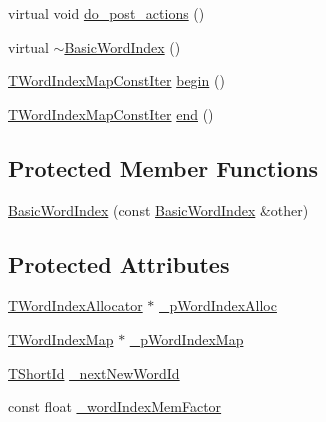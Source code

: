 \begin{DoxyCompactItemize}
virtual void \hyperlink{classuva_1_1smt_1_1tries_1_1dictionary_1_1_basic_word_index_a8f76161797b91979e1c94d3a8be6ae82}{do\+\_\+post\+\_\+actions} ()
\item 
virtual \hyperlink{classuva_1_1smt_1_1tries_1_1dictionary_1_1_basic_word_index_aae2a6fd6f0a6d6d5b76278f628b31ba1}{$\sim$\+Basic\+Word\+Index} ()
\item 
\hyperlink{classuva_1_1smt_1_1tries_1_1dictionary_1_1_basic_word_index_aedf00c11ba1f7ef5565ed7ed523087ec}{T\+Word\+Index\+Map\+Const\+Iter} \hyperlink{classuva_1_1smt_1_1tries_1_1dictionary_1_1_basic_word_index_aa918c020da3d1559f327776a1177404d}{begin} ()
\item 
\hyperlink{classuva_1_1smt_1_1tries_1_1dictionary_1_1_basic_word_index_aedf00c11ba1f7ef5565ed7ed523087ec}{T\+Word\+Index\+Map\+Const\+Iter} \hyperlink{classuva_1_1smt_1_1tries_1_1dictionary_1_1_basic_word_index_aa6fd45516d2be557c6447124880f23c6}{end} ()
\end{DoxyCompactItemize}
\subsection*{Protected Member Functions}
\begin{DoxyCompactItemize}
\item 
\hyperlink{classuva_1_1smt_1_1tries_1_1dictionary_1_1_basic_word_index_a7a4a2a9a405e6073f1c5aec4040327bf}{Basic\+Word\+Index} (const \hyperlink{classuva_1_1smt_1_1tries_1_1dictionary_1_1_basic_word_index}{Basic\+Word\+Index} \&other)
\end{DoxyCompactItemize}
\subsection*{Protected Attributes}
\begin{DoxyCompactItemize}
\item 
\hyperlink{classuva_1_1smt_1_1tries_1_1dictionary_1_1_basic_word_index_a8905f9a7cdaf1c7295043be33de20749}{T\+Word\+Index\+Allocator} $\ast$ \hyperlink{classuva_1_1smt_1_1tries_1_1dictionary_1_1_basic_word_index_a466c8ca9da06fd8c6640f20b77ca5b8a}{\+\_\+p\+Word\+Index\+Alloc}
\item 
\hyperlink{classuva_1_1smt_1_1tries_1_1dictionary_1_1_basic_word_index_ab9afbbd6dda7d8579f804508ac094574}{T\+Word\+Index\+Map} $\ast$ \hyperlink{classuva_1_1smt_1_1tries_1_1dictionary_1_1_basic_word_index_a549d0686e0530922a7261e33a0cdfd20}{\+\_\+p\+Word\+Index\+Map}
\item 
\hyperlink{namespaceuva_1_1smt_1_1hashing_adcf22e1982ad09d3a63494c006267469}{T\+Short\+Id} \hyperlink{classuva_1_1smt_1_1tries_1_1dictionary_1_1_basic_word_index_a416378bae82da48aea2aa2b83f54731b}{\+\_\+next\+New\+Word\+Id}
\item 
const float \hyperlink{classuva_1_1smt_1_1tries_1_1dictionary_1_1_basic_word_index_a4efb17e8e41fbd432db6e0472df193ad}{\+\_\+word\+Index\+Mem\+Factor}
\end{DoxyCompactItemize}
